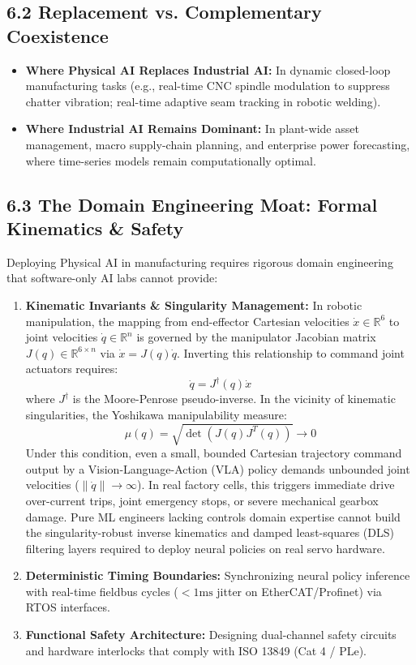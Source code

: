 \documentclass[11pt,a4paper]{article}
\begin{document}
\subsection{6.2 Replacement vs. Complementary Coexistence}
\begin{itemize}
    \item \textbf{Where Physical AI Replaces Industrial AI:} In dynamic closed-loop manufacturing tasks (e.g., real-time CNC spindle modulation to suppress chatter vibration; real-time adaptive seam tracking in robotic welding).
    \item \textbf{Where Industrial AI Remains Dominant:} In plant-wide asset management, macro supply-chain planning, and enterprise power forecasting, where time-series models remain computationally optimal.
\end{itemize}

\subsection{6.3 The Domain Engineering Moat: Formal Kinematics \& Safety}
Deploying Physical AI in manufacturing requires rigorous domain engineering that software-only AI labs cannot provide:

\begin{enumerate}
    \item \textbf{Kinematic Invariants \& Singularity Management:}
    In robotic manipulation, the mapping from end-effector Cartesian velocities $\dot{x} \in \mathbb{R}^6$ to joint velocities $\dot{q} \in \mathbb{R}^n$ is governed by the manipulator Jacobian matrix $J(q) \in \mathbb{R}^{6 \times n}$ via $\dot{x} = J(q)\dot{q}$. Inverting this relationship to command joint actuators requires:
    \[
    \dot{q} = J^{\dagger}(q)\dot{x}
    \]
    where $J^{\dagger}$ is the Moore-Penrose pseudo-inverse. In the vicinity of kinematic singularities, the Yoshikawa manipulability measure:
    \[
    \mu(q) = \sqrt{\det\left(J(q)J^T(q)\right)} \longrightarrow 0
    \]
    Under this condition, even a small, bounded Cartesian trajectory command output by a Vision-Language-Action (VLA) policy demands unbounded joint velocities ($\|\dot{q}\| \to \infty$). In real factory cells, this triggers immediate drive over-current trips, joint emergency stops, or severe mechanical gearbox damage. Pure ML engineers lacking controls domain expertise cannot build the singularity-robust inverse kinematics and damped least-squares (DLS) filtering layers required to deploy neural policies on real servo hardware.

    \item \textbf{Deterministic Timing Boundaries:}
    Synchronizing neural policy inference with real-time fieldbus cycles ($<1\text{ms}$ jitter on EtherCAT/Profinet) via RTOS interfaces.

    \item \textbf{Functional Safety Architecture:}
    Designing dual-channel safety circuits and hardware interlocks that comply with ISO 13849 (Cat 4 / PLe).
\end{enumerate}
\end{document}
